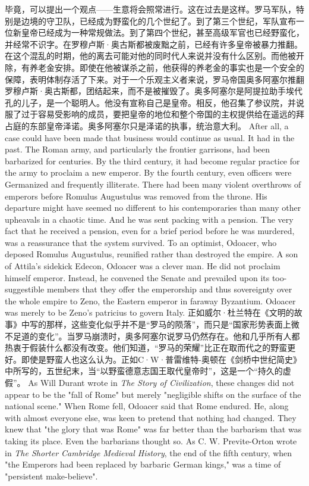 \begin{paracol}{2}
\switchcolumn*
毕竟，可以提出一个观点——生意将会照常进行。这在过去是这样。罗马军队，特别是边境的守卫队，已经成为野蛮化的几个世纪了。到了第三个世纪，军队宣布一位新皇帝已经成为一种常规做法。到了第四个世纪，甚至高级军官也已经野蛮化，并经常不识字。在罗穆卢斯·奥古斯都被废黜之前，已经有许多皇帝被暴力推翻。在这个混乱的时期，他的离去可能对他的同时代人来说并没有什么区别。而他被开除，有养老金安排。即使在他被谋杀之前，他获得的养老金的事实也是一个安全的保障，表明体制存活了下来。对于一个乐观主义者来说，罗马帝国奥多阿塞尔推翻罗穆卢斯·奥古斯都，团结起来，而不是被摧毁了。奥多阿塞尔是阿提拉助手埃代孔的儿子，是一个聪明人。他没有宣称自己是皇帝。相反，他召集了参议院，并说服了过于容易受影响的成员，要把皇帝的地位和整个帝国的主权提供给在遥远的拜占庭的东部皇帝泽诺。奥多阿塞尔只是泽诺的执事，统治意大利。
\switchcolumn
After all, a case could have been made that business would continue as usual. It had in the past. The Roman army, and particularly the frontier garrisons, had been barbarized for centuries. By the third century, it had become regular practice for the army to proclaim a new emperor. By the fourth century, even officers were Germanized and frequently illiterate. There had been many violent overthrows of emperors before Romulus Augustulus was removed from the throne. His departure might have seemed no different to his contemporaries than many other upheavals in a chaotic time. And he was sent packing with a pension. The very fact that he received a pension, even for a brief period before he was murdered, was a reassurance that the system survived. To an optimist, Odoacer, who deposed Romulus Augustulus, reunified rather than destroyed the empire. A son of Attila's sidekick Edecon, Odoacer was a clever man. He did not proclaim himself emperor. Instead, he convened the Senate and prevailed upon its too-suggestible members that they offer the emperorship and thus sovereignty over the whole empire to Zeno, the Eastern emperor in faraway Byzantium. Odoacer was merely to be Zeno's patricius to govern Italy.  
\switchcolumn*
正如威尔·杜兰特在《文明的故事》中写的那样，这些变化似乎并不是“罗马的陨落”，而只是“国家形势表面上微不足道的变化”。当罗马崩溃时，奥多阿塞尔说罗马仍然存在。他和几乎所有人都热衷于假装什么都没有改变。他们知道，“罗马的荣耀”比正在取而代之的野蛮更好。即使是野蛮人也这么认为。正如C·W·普雷维特-奥顿在《剑桥中世纪简史》中所写的，五世纪末，当“以野蛮德意志国王取代皇帝时”，这是一个“持久的虚假”。
\switchcolumn
As Will Durant wrote in \emph{The Story of Civilization}, these changes did not appear to be the "fall of Rome" but merely "negligible shifts on the surface of the national scene." When Rome fell, Odoacer said that Rome endured. He, along with almost everyone else, was keen to pretend that nothing had changed. They knew that "the glory that was Rome" was far better than the barbarism that was taking its place. Even the barbarians thought so. As C. W. Previte-Orton wrote in \emph{The Shorter Cambridge Medieval History}, the end of the fifth century, when "the Emperors had been replaced by barbaric German kings," was a time of "persistent make-believe".  
\end{paracol}

